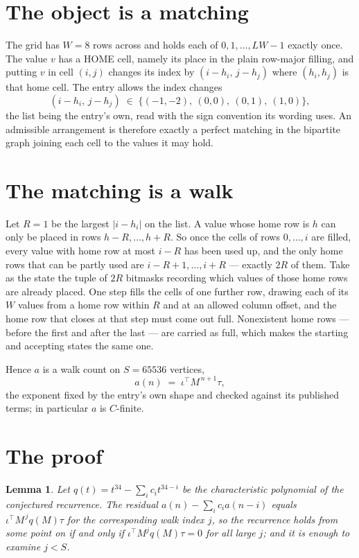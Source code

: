 \documentclass[11pt,a4paper]{article}
\theoremstyle{plain}
\newtheorem{lemma}[theorem]{Lemma}
\theoremstyle{definition}
\begin{document}
\section{The object is a matching}

The grid has $W=8$ rows across and holds each of $0,1,\dots,LW-1$ exactly once. The value
$v$ has a HOME cell, namely its place in the plain row-major filling, and putting $v$ in cell
$(i,j)$ changes its index by $(i-h_i,\,j-h_j)$ where $(h_i,h_j)$ is that home cell. The entry
allows the index changes
\[
(i-h_i,\,j-h_j)\;\in\;\{(-1,-2),\ (0,0),\ (0,1),\ (1,0)\},
\]
the list being the entry's own, read with the sign convention its wording uses. An admissible
arrangement is therefore exactly a perfect matching in the bipartite graph joining each cell to
the values it may hold.

\section{The matching is a walk}

Let $R=1$ be the largest $|i-h_i|$ on the list. A value whose home row is $h$ can only be
placed in rows $h-R,\dots,h+R$. So once the cells of rows $0,\dots,i$ are filled, every
value with home row at most $i-R$ has been used up, and the only home rows that can be
partly used are $i-R+1,\dots,i+R$ --- exactly $2R$ of them. Take as the state the tuple of
$2R$ bitmasks recording which values of those home rows are already placed. One step fills
the cells of one further row, drawing each of its $W$ values from a home row within $R$
and at an allowed column offset, and the home row that closes at that step must come out
full. Nonexistent home rows --- before the first and after the last --- are carried as
full, which makes the starting and accepting states the same one.

Hence $a$ is a walk count on $S=65536$ vertices,
\[
a(n)\;=\;\iota^{\!\top}M^{\,n+1}\tau ,
\]
the exponent fixed by the entry's own shape and checked against its published terms; in
particular $a$ is $C$-finite.

\section{The proof}

\begin{lemma}\label{lem:crit}
Let $q(t)=t^{34}-\sum_i c_it^{34-i}$ be the characteristic polynomial of the
conjectured recurrence. The residual $a(n)-\sum_ic_ia(n-i)$ equals
$\iota^{\!\top}M^{\,j}q(M)\tau$ for the corresponding walk index $j$, so the recurrence
holds from some point on if and only if $\iota^{\!\top}M^{j}q(M)\tau=0$ for all large $j$;
and it is enough to examine $j<S$.
\end{lemma}
\end{document}
